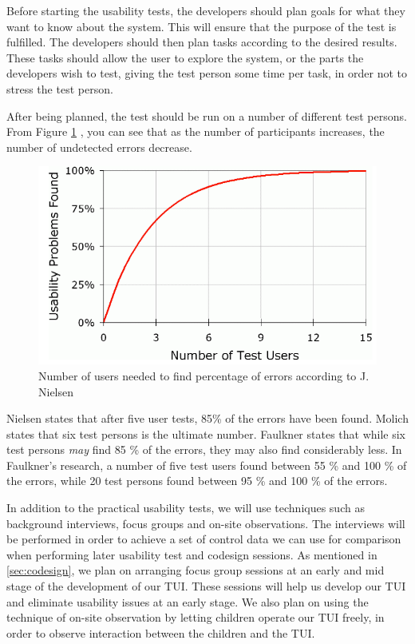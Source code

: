 Before starting the usability tests, the developers should plan goals for what they want to know about the system\cite{isosoftwareengineering}. This will ensure that the purpose of the test is fulfilled. The developers should then plan tasks according to the desired results. These tasks should allow the user to explore the system, or the parts the developers wish to test, giving the test person some time per task, in order not to stress the test person. 

After being planned, the test should be run on a number of different test persons. From Figure \ref{fig:numberoftests}
, you can see that as the number of participants increases, the number of undetected errors decrease. 



 \begin{figure}
 		\centering
 			\includegraphics[scale=0.4]{Pictures/app-screenshots/numberoftests.png}
 		\caption{Number of users needed to find percentage of errors according to J. Nielsen\cite{nielsennumberoftests}}
 		 		\label{fig:numberoftests}
 \end{figure}


Nielsen states that after five user tests, 85\% of the errors have been found\cite{nielsennumberoftests}. Molich\cite{molich2008usable} states that six test persons is the ultimate number. Faulkner\cite{faulkner2003beyond} states that while six test persons \textit{may} find 85 \% of the errors, they may also find considerably less. In Faulkner's research, a number of five test users found between 55 \% and 100 \% of the errors, while 20 test persons found between 95 \% and 100 \% of the errors. 

In addition to the practical usability tests, we will use techniques such as background interviews, focus groups and on-site observations. The interviews will be performed in order to achieve a set of control data we can use for comparison when performing later usability test and codesign sessions. As mentioned in \ref{sec:codesign}, we plan on arranging focus group sessions at an early and mid stage of the development of our TUI. These sessions will help us develop our TUI and eliminate usability issues at an early stage. We also plan on using the technique of on-site observation by letting children operate our TUI freely, in order to observe interaction between the children and the TUI. 


